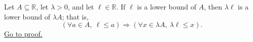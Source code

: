 \begin{proposition}
\label{prop:positive-dilation-preserves-lower-bounds}
Let $A\subseteq\mathbb{R}$, let $\lambda>0$, and let
$\ell\in\mathbb{R}$.  If $\ell$ is a lower bound of $A$, then
$\lambda\ell$ is a lower bound of $\lambda A$; that is,
\[
\left(\forall a\in A,\ \ell\leq a\right)
\Longrightarrow
\left(\forall x\in\lambda A,\ \lambda\ell\leq x\right).
\]
\hyperref[prf:positive-dilation-preserves-lower-bounds]{Go to proof.}
\end{proposition}